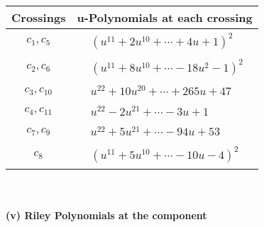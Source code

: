 \documentclass[1p]{elsarticle_modified}
\theoremstyle{definition}
\begin{document}
\begin{tabular}{m{50pt}|m{274pt}}
Crossings & \hspace{64pt}u-Polynomials at each crossing \\
\hline $$\begin{aligned}c_{1},c_{5}\end{aligned}$$&$\begin{aligned}
&(u^{11}+2 u^{10}+\cdots+4 u+1)^{2}
\end{aligned}$\\
\hline $$\begin{aligned}c_{2},c_{6}\end{aligned}$$&$\begin{aligned}
&(u^{11}+8 u^{10}+\cdots-18 u^2-1)^{2}
\end{aligned}$\\
\hline $$\begin{aligned}c_{3},c_{10}\end{aligned}$$&$\begin{aligned}
&u^{22}+10 u^{20}+\cdots+265 u+47
\end{aligned}$\\
\hline $$\begin{aligned}c_{4},c_{11}\end{aligned}$$&$\begin{aligned}
&u^{22}-2 u^{21}+\cdots-3 u+1
\end{aligned}$\\
\hline $$\begin{aligned}c_{7},c_{9}\end{aligned}$$&$\begin{aligned}
&u^{22}+5 u^{21}+\cdots-94 u+53
\end{aligned}$\\
\hline $$\begin{aligned}c_{8}\end{aligned}$$&$\begin{aligned}
&(u^{11}+5 u^{10}+\cdots-10 u-4)^{2}
\end{aligned}$\\
\hline
\end{tabular}\\~\\
\newpage\renewcommand{\arraystretch}{1}
\flushleft \textbf{(v) Riley Polynomials at the component}\newline \\
\end{document}
